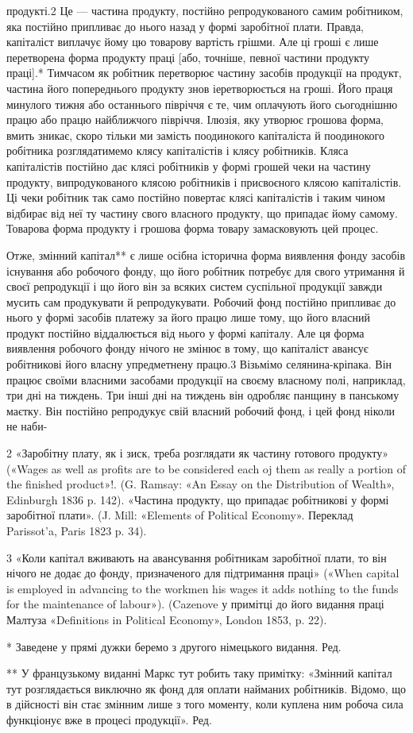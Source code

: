 продукті.2 Це — частина продукту, постійно репродукованого
самим робітником, яка постійно припливає до нього назад у
формі заробітної плати. Правда, капіталіст виплачує йому цю
товарову вартість грішми. Але ці гроші є лише перетворена форма
продукту праці [або, точніше, певної частини продукту праці].*
Тимчасом як робітник перетворює частину засобів продукції
на продукт, частина його попереднього продукту знов іеретворюється
на гроші. Його праця минулого тижня або останнього
півріччя є те, чим оплачують його сьогоднішню працю або працю
найближчого півріччя. Ілюзія, яку утворює грошова форма,
вмить зникає, скоро тільки ми замість поодинокого капіталіста
й поодинокого робітника розглядатимемо клясу капіталістів і
клясу робітників. Кляса капіталістів постійно дає клясі робітників
у формі грошей чеки на частину продукту, випродукованого
клясою робітників і присвоєного клясою капіталістів. Ці
чеки робітник так само постійно повертає клясі капіталістів і
таким чином відбирає від неї ту частину свого власного продукту,
що припадає йому самому. Товарова форма продукту і грошова
форма товару замасковують цей процес.

Отже, змінний капітал** є лише осібна історична форма виявлення
фонду засобів існування або робочого фонду, що його
робітник потребує для свого утримання й своєї репродукції і
що його він за всяких систем суспільної продукції завжди мусить
сам продукувати й репродукувати. Робочий фонд постійно
припливає до нього у формі засобів платежу за його працю лише
тому, що його власний продукт постійно віддалюється від нього
у формі капіталу. Але ця форма виявлення робочого фонду нічого
не змінює в тому, що капіталіст авансує робітникові його
власну упредметнену працю.3 Візьмімо селянина-кріпака. Він
працює своїми власними засобами продукції на своєму власному
полі, наприклад, три дні на тиждень. Три інші дні на тиждень
він одробляє панщину в панському маєтку. Він постійно репродукує
свій власний робочий фонд, і цей фонд ніколи не наби-

2 «Заробітну плату, як і зиск, треба розглядати як частину готового
продукту» («Wages as well as profits are to be considered each oj
them as really a portion of the finished product»!. (G. Ramsay: «An Essay
on the Distribution of Wealth», Edinburgh 1836 p. 142). «Частина продукту,
що припадає робітникові у формі заробітної плати». (J. Mill:
«Elements of Political Economy». Переклад Parissot’a, Paris 1823 p. 34).

3 «Коли капітал вживають на авансування робітникам заробітної
плати, то він нічого не додає до фонду, призначеного для підтримання
праці» («When capital is employed in advancing to the workmen his wages
it adds nothing to the funds for the maintenance of labour»). (Cazenove
у примітці до його видання праці Малтуза «Definitions in Political Economy»,
London 1853, p. 22).

*    Заведене у прямі дужки беремо з другого німецького видання. Ред.

** У французькому виданні Маркс тут робить таку примітку: «Змінний
капітал тут розглядається виключно як фонд для оплати найманих
робітників. Відомо, що в дійсності він стає змінним лише з того моменту,
коли куплена ним робоча сила функціонує вже в процесі продукції».
Ред.
